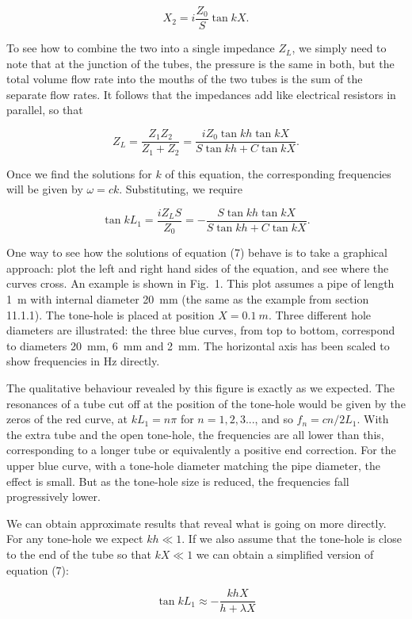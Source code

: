   $$X_2=i\dfrac{Z_0}{S} \tan kX . \tag{5}$$ 

  To see how to combine the two into a single impedance $Z_L$, we simply need 
  to note that at the junction of the tubes, the pressure is the same in both, 
  but the total volume flow rate into the mouths of the two tubes is the sum of 
  the separate flow rates. It follows that the impedances add like electrical 
  resistors in parallel, so that 

  $$Z_L=\dfrac{Z_1 Z_2}{Z_1 + Z_2} = \dfrac{i Z_0 \tan kh \tan kX}{S \tan kh + 
  C \tan kX} . \tag{6}$$ 

  Once we find the solutions for $k$ of this equation, the corresponding 
  frequencies will be given by $\omega=ck$. Substituting, we require 

  $$\tan kL_1 = \dfrac{iZ_L S}{Z_0} = -\dfrac{S\tan kh \tan kX}{S \tan kh + C 
  \tan kX} . \tag{7}$$ 

  One way to see how the solutions of equation (7) behave is to take a 
  graphical approach: plot the left and right hand sides of the equation, and 
  see where the curves cross. An example is shown in Fig.\ 1. This plot assumes 
  a pipe of length 1~m with internal diameter 20~mm (the same as the example 
  from section 11.1.1). The tone-hole is placed at position $X=0.1\mathrm~m$. 
  Three different hole diameters are illustrated: the three blue curves, from 
  top to bottom, correspond to diameters 20~mm, 6~mm and 2~mm. The horizontal 
  axis has been scaled to show frequencies in Hz directly. 

  The qualitative behaviour revealed by this figure is exactly as we expected. 
  The resonances of a tube cut off at the position of the tone-hole would be 
  given by the zeros of the red curve, at $kL_1=n \pi$ for $n=1,2,3...$, and so 
  $f_n=cn/2L_1$. With the extra tube and the open tone-hole, the frequencies 
  are all lower than this, corresponding to a longer tube or equivalently a 
  positive end correction. For the upper blue curve, with a tone-hole diameter 
  matching the pipe diameter, the effect is small. But as the tone-hole size is 
  reduced, the frequencies fall progressively lower. 

  We can obtain approximate results that reveal what is going on more directly. 
  For any tone-hole we expect $kh \ll 1$. If we also assume that the tone-hole 
  is close to the end of the tube so that $kX \ll 1$ we can obtain a simplified 
  version of equation (7): 

  $$\tan kL_1 \approx -\dfrac{khX}{h+ \lambda X} \tag{8}$$ 

